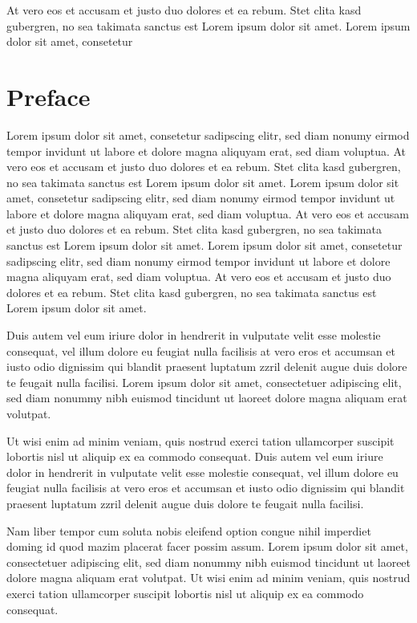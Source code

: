 At vero eos et accusam et justo duo dolores et ea rebum. Stet clita kasd gubergren, no sea takimata sanctus est Lorem ipsum dolor sit amet. Lorem ipsum dolor sit amet, consetetur
\newpage
\section*{Preface}\label{sec:preface_en}

Lorem ipsum dolor sit amet, consetetur sadipscing elitr, sed diam nonumy eirmod tempor invidunt ut labore et dolore magna aliquyam erat, sed diam voluptua. At vero eos et accusam et justo duo dolores et ea rebum. Stet clita kasd gubergren, no sea takimata sanctus est Lorem ipsum dolor sit amet. Lorem ipsum dolor sit amet, consetetur sadipscing elitr, sed diam nonumy eirmod tempor invidunt ut labore et dolore magna aliquyam erat, sed diam voluptua. At vero eos et accusam et justo duo dolores et ea rebum. Stet clita kasd gubergren, no sea takimata sanctus est Lorem ipsum dolor sit amet. Lorem ipsum dolor sit amet, consetetur sadipscing elitr, sed diam nonumy eirmod tempor invidunt ut labore et dolore magna aliquyam erat, sed diam voluptua. At vero eos et accusam et justo duo dolores et ea rebum. Stet clita kasd gubergren, no sea takimata sanctus est Lorem ipsum dolor sit amet.   

Duis autem vel eum iriure dolor in hendrerit in vulputate velit esse molestie consequat, vel illum dolore eu feugiat nulla facilisis at vero eros et accumsan et iusto odio dignissim qui blandit praesent luptatum zzril delenit augue duis dolore te feugait nulla facilisi. Lorem ipsum dolor sit amet, consectetuer adipiscing elit, sed diam nonummy nibh euismod tincidunt ut laoreet dolore magna aliquam erat volutpat.   

Ut wisi enim ad minim veniam, quis nostrud exerci tation ullamcorper suscipit lobortis nisl ut aliquip ex ea commodo consequat. Duis autem vel eum iriure dolor in hendrerit in vulputate velit esse molestie consequat, vel illum dolore eu feugiat nulla facilisis at vero eros et accumsan et iusto odio dignissim qui blandit praesent luptatum zzril delenit augue duis dolore te feugait nulla facilisi.   

Nam liber tempor cum soluta nobis eleifend option congue nihil imperdiet doming id quod mazim placerat facer possim assum. Lorem ipsum dolor sit amet, consectetuer adipiscing elit, sed diam nonummy nibh euismod tincidunt ut laoreet dolore magna aliquam erat volutpat. Ut wisi enim ad minim veniam, quis nostrud exerci tation ullamcorper suscipit lobortis nisl ut aliquip ex ea commodo consequat.   

